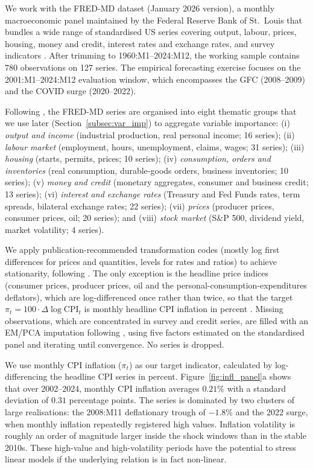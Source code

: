 \documentclass[12pt,a4paper]{article}
\begin{document}
We work with the FRED-MD dataset (January 2026 version), a monthly macroeconomic panel maintained by the Federal Reserve Bank of St.\ Louis that bundles a wide range of standardised US series covering output, labour, prices, housing, money and credit, interest rates and exchange rates, and survey indicators \citep{mccracken2016fredmd}. After trimming to 1960:M1--2024:M12, the working sample contains 780 observations on 127 series. The empirical forecasting exercise focuses on the 2001:M1--2024:M12 evaluation window, which encompasses the GFC (2008--2009) and the COVID surge (2020--2022).

Following \citet{mccracken2016fredmd}, the FRED-MD series are organised into eight thematic groups that we use later (Section~\ref{subsec:var_imp}) to aggregate variable importance: (i) \emph{output and income} (industrial production, real personal income; 16 series); (ii) \emph{labour market} (employment, hours, unemployment, claims, wages; 31 series); (iii) \emph{housing} (starts, permits, prices; 10 series); (iv) \emph{consumption, orders and inventories} (real consumption, durable-goods orders, business inventories; 10 series); (v) \emph{money and credit} (monetary aggregates, consumer and business credit; 13 series); (vi) \emph{interest and exchange rates} (Treasury and Fed Funds rates, term spreads, bilateral exchange rates; 22 series); (vii) \emph{prices} (producer prices, consumer prices, oil; 20 series); and (viii) \emph{stock market} (S\&P 500, dividend yield, market volatility; 4 series).

We apply publication-recommended transformation codes (mostly log first differences for prices and quantities, levels for rates and ratios) to achieve stationarity, following \citet{mccracken2016fredmd}. The only exception is the headline price indices (consumer prices, producer prices, oil and the personal-consumption-expenditures deflators), which are log-differenced once rather than twice, so that the target $\pi_t = 100 \cdot \Delta \log \mathrm{CPI}_t$ is monthly headline CPI inflation in percent \citep{medeiros2021veiga}. Missing observations, which are concentrated in survey and credit series, are filled with an EM/PCA imputation following \citet{stockwatson2002}, using five factors estimated on the standardised panel and iterating until convergence. No series is dropped.

We use monthly CPI inflation ($\pi_t$) as our target indicator, calculated by log-differencing the headline CPI series in percent. Figure~\ref{fig:infl_panel}a shows that over 2002--2024, monthly CPI inflation averages $0.21\%$ with a standard deviation of $0.31$ percentage points. The series is dominated by two clusters of large realisations: the 2008:M11 deflationary trough of $-1.8\%$ and the 2022 surge, when monthly inflation repeatedly registered high values. Inflation volatility is roughly an order of magnitude larger inside the shock windows than in the stable 2010s. These high-value and high-volatility periods have the potential to stress linear models if the underlying relation is in fact non-linear.
\end{document}
